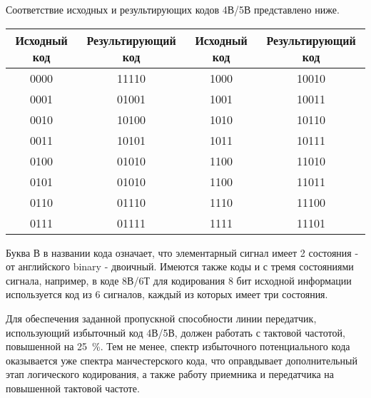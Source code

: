 Соответствие исходных и результирующих кодов 4В/5В представлено ниже.

\begin{table}[!ht]
    \begin{tabular}{|c|c|c|c|}
        \hline
        \textbf{Исходный код} & \textbf{Результирующий код} & \textbf{Исходный код} & \textbf{Результирующий код} \\ \hline
        0000                  & 11110                       & 1000                  & 10010                       \\ \hline
        0001                  & 01001                       & 1001                  & 10011                       \\ \hline
        0010                  & 10100                       & 1010                  & 10110                       \\ \hline
        0011                  & 10101                       & 1011                  & 10111                       \\ \hline
        0100                  & 01010                       & 1100                  & 11010                       \\ \hline
        0101                  & 01010                       & 1100                  & 11011                       \\ \hline
        0110                  & 01110                       & 1110                  & 11100                       \\ \hline
        0111                  & 01111                       & 1111                  & 11101                       \\ \hline
    \end{tabular}
\end{table}

Буква В в названии кода означает, что элементарный сигнал имеет 2 состояния - от английского binary - двоичный.
Имеются также коды и с тремя состояниями сигнала, например, в коде 8В/6Т для кодирования 8 бит исходной информации используется код из 6 сигналов, каждый из которых имеет три состояния.

Для обеспечения заданной пропускной способности линии передатчик, использующий избыточный код 4В/5В, должен работать с тактовой частотой, повышенной на 25~\%.
Тем не менее, спектр избыточного потенциального кода оказывается уже спектра манчестерского кода, что оправдывает дополнительный этап логического кодирования, а также работу приемника и передатчика на повышенной тактовой частоте.

